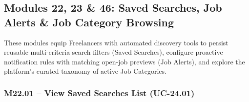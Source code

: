 
\newpage
\subsection{Modules 22, 23 \& 46: Saved Searches, Job Alerts \& Job Category Browsing}

These modules equip Freelancers with automated discovery tools to persist reusable multi-criteria search filters (Saved Searches), configure proactive notification rules with matching open-job previews (Job Alerts), and explore the platform's curated taxonomy of active Job Categories.

\subsubsection{M22.01 -- View Saved Searches List (UC-24.01)}

